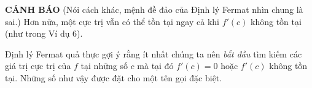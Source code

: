 \begin{minipage}[t]{0.70\textwidth}
    \vspace{9pt}
    \noindent\warningsign\hspace{0.5em}\textbf{\textsf{\color{stewartred}CẢNH BÁO}} (Nói cách khác, mệnh đề đảo của Định lý Fermat nhìn chung là sai.) {\color{stewartred}Hơn nữa, một cực trị vẫn có thể tồn tại ngay cả khi $f'(c)$ không tồn tại} (như trong Ví dụ 6).

    \vspace{9pt}
    Định lý Fermat quả thực gợi ý rằng ít nhất chúng ta nên \textit{bắt đầu} tìm kiếm các giá trị cực trị của $f$ tại những số $c$ mà tại đó $f'(c) = 0$ hoặc $f'(c)$ không tồn tại. Những số như vậy được đặt cho một tên gọi đặc biệt.
\end{minipage}
